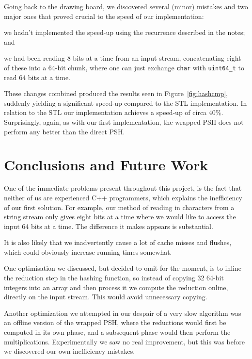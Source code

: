 \documentclass[]{article}
\newcommand{\funk}[1]{\texttt{\small #1}}
\newcommand{\cpp}{C+\!+\xspace}
\begin{document}
Going back to the drawing board, we discovered several (minor) mistakes and two major ones that proved crucial to the speed of our implementation:
\begin{inparaenum}[(1)]
\item we hadn't implemented the speed-up using the recurrence described in the notes; and
\item we had been reading 8 bits at a time from an input stream, concatenating eight of these into a 64-bit chunk, where one can just exchange \funk{char} with \funk{uint64\_t} to read 64 bits at a time.
\end{inparaenum}
These changes combined produced the results seen in Figure~\ref{fig:hashcmp}, suddenly yielding a significant speed-up compared to the STL implementation. In relation to the STL our implementation achieves a speed-up of circa 40\%. Surprisingly, again, as with our first implementation, the wrapped PSH does not perform any better than the direct PSH.

\section{Conclusions and Future Work}

One of the immediate problems present throughout this project, is the fact that neither of us are experienced \cpp programmers, which explains the inefficiency of our first solution. For example, our method of reading in characters from a string stream only gives eight bits at a time where we would like to access the input 64 bits at a time. The difference it makes appears is substantial.

It is also likely that we inadvertently cause a lot of cache misses and flushes, which could obviously increase running times somewhat.

One optimisation we discussed, but decided to omit for the moment, is to inline the reduction step in the hashing function, so instead of copying 32 64-bit integers into an array and then process it we compute the reduction online, directly on the input stream. This would avoid unnecessary copying.

Another optimization we attempted in our despair of a very slow algorithm was an offline version of the wrapped PSH, where the reductions would first be computed in its own phase, and a subsequent phase would then perform the multiplications. Experimentally we saw no real improvement, but this was before we discovered our own inefficiency mistakes.
\end{document}
